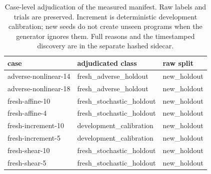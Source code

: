 \begin{table}[tbp]
\centering\scriptsize
\setlength{\tabcolsep}{3pt}
\caption{Case-level adjudication of the measured manifest. Raw labels and trials are preserved. Increment is deterministic development calibration; new seeds do not create unseen programs when the generator ignores them. Full reasons and the timestamped discovery are in the separate hashed sidecar.}
\label{tab:current-classification}
\begin{tabular}{p{3.4cm}p{4.8cm}p{2.8cm}}
\toprule
case & adjudicated class & raw split \\
\midrule
adverse-nonlinear-14 & fresh\_adverse\_holdout & new\_holdout \\
adverse-nonlinear-18 & fresh\_adverse\_holdout & new\_holdout \\
fresh-affine-10 & fresh\_stochastic\_holdout & new\_holdout \\
fresh-affine-4 & fresh\_stochastic\_holdout & new\_holdout \\
fresh-increment-10 & development\_calibration & new\_holdout \\
fresh-increment-5 & development\_calibration & new\_holdout \\
fresh-shear-10 & fresh\_stochastic\_holdout & new\_holdout \\
fresh-shear-5 & fresh\_stochastic\_holdout & new\_holdout \\
\bottomrule
\end{tabular}
\end{table}

